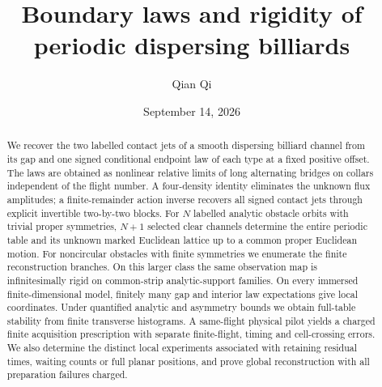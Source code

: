 
\title[Boundary laws and periodic rigidity]{Boundary laws and rigidity of periodic dispersing billiards}
\author{Qian Qi}
\date{September 14, 2026}

\begin{abstract}
We recover the two labelled contact jets of a smooth dispersing billiard
channel from its gap and one signed conditional endpoint law of each type
at a fixed positive offset.  The laws are obtained as nonlinear relative
limits of long alternating bridges on collars independent of the flight
number.  A four-density identity eliminates the unknown flux amplitudes;
a finite-remainder action inverse recovers all signed contact jets through
explicit invertible two-by-two blocks.  For $N$ labelled analytic obstacle
orbits with trivial proper symmetries, $N+1$ selected clear channels
determine the entire periodic table and its unknown marked Euclidean
lattice up to a common proper Euclidean motion.  For noncircular obstacles
with finite symmetries we enumerate the finite reconstruction branches.
On this larger class the same observation map is infinitesimally rigid
on common-strip analytic-support families.  On
every immersed finite-dimensional model, finitely many gap and interior
law expectations give local coordinates.  Under quantified analytic and
asymmetry bounds we obtain full-table stability from finite transverse
histograms.  A same-flight physical pilot yields a charged finite
acquisition prescription with separate finite-flight, timing and
cell-crossing errors.  We also determine the distinct local experiments
associated with retaining residual times, waiting counts or full planar
positions, and prove global reconstruction with all preparation failures
charged.
\end{abstract}
\makeatletter
\def\@setabstracta{%
  \ifvoid\abstractbox\else
    \skip@20\p@ \advance\skip@-\lastskip
    \advance\skip@-\baselineskip \vskip\skip@
    \unvbox\abstractbox \prevdepth\z@
  \fi}
\makeatother
\maketitle
\setcounter{tocdepth}{1}
\tableofcontents



